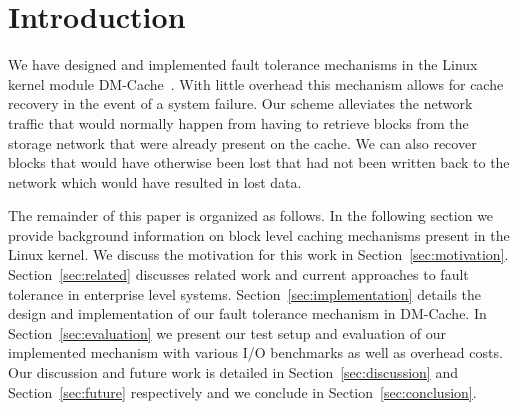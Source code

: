 \section{Introduction}

We have designed and implemented fault tolerance mechanisms in the
Linux kernel module DM-Cache~\cite{DM-Cache}. With little overhead
this mechanism allows for cache recovery in the event of a system
failure. Our scheme alleviates the network traffic that would normally
happen from having to retrieve blocks from the storage network that
were already present on the cache. We can also recover blocks that
would have otherwise been lost that had not been written back to the
network which would have resulted in lost data.

The remainder of this paper is organized as follows. In the following
section we provide background information on block level caching
mechanisms present in the Linux kernel. We discuss the motivation for
this work in Section~\ref{sec:motivation}. Section~\ref{sec:related}
discusses related work and current approaches to fault tolerance in
enterprise level systems. Section~\ref{sec:implementation} details the
design and implementation of our fault tolerance mechanism in
DM-Cache. In Section~\ref{sec:evaluation} we present our test setup
and evaluation of our implemented mechanism with various I/O
benchmarks as well as overhead costs. Our discussion and future work
is detailed in Section~\ref{sec:discussion} and
Section~\ref{sec:future} respectively and we conclude in
Section~\ref{sec:conclusion}.

